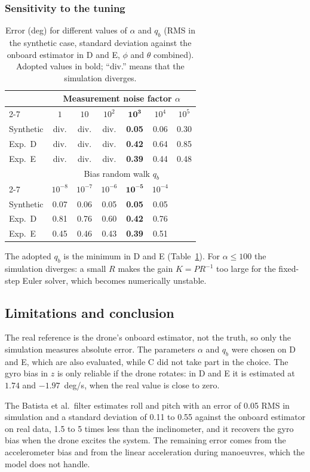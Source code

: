 \documentclass[11pt]{article}
\begin{document}
\subsubsection{Sensitivity to the tuning}
\label{sec:sens}

\begin{table}[htbp]
\caption{Error (deg) for different values of $\alpha$ and $q_b$ (RMS in the synthetic case, standard deviation against the onboard estimator in D and E, $\phi$ and $\theta$ combined). Adopted values in bold; ``div.'' means that the simulation diverges.}
\label{tab:sens}
\centering
\setlength{\tabcolsep}{6pt}
\begin{tabular}{l cccccc}
\toprule
 & \multicolumn{6}{c}{Measurement noise factor $\alpha$} \\
\cmidrule(lr){2-7}
 & $1$ & $10$ & $10^{2}$ & $\mathbf{10^{3}}$ & $10^{4}$ & $10^{5}$ \\
\midrule
Synthetic & div. & div. & div. & \textbf{0.05} & 0.06 & 0.30 \\
Exp.\ D   & div. & div. & div. & \textbf{0.42} & 0.64 & 0.85 \\
Exp.\ E   & div. & div. & div. & \textbf{0.39} & 0.44 & 0.48 \\
\midrule
 & \multicolumn{6}{c}{Bias random walk $q_b$} \\
\cmidrule(lr){2-7}
 & $10^{-8}$ & $10^{-7}$ & $10^{-6}$ & $\mathbf{10^{-5}}$ & $10^{-4}$ & \\
\midrule
Synthetic & 0.07 & 0.06 & 0.05 & \textbf{0.05} & 0.05 & \\
Exp.\ D   & 0.81 & 0.76 & 0.60 & \textbf{0.42} & 0.76 & \\
Exp.\ E   & 0.45 & 0.46 & 0.43 & \textbf{0.39} & 0.51 & \\
\bottomrule
\end{tabular}
\end{table}

The adopted $q_b$ is the minimum in D and E (Table~\ref{tab:sens}).
For $\alpha\le100$ the simulation diverges: a small $R$ makes the gain $K=PR^{-1}$ too large for the fixed-step Euler solver, which becomes numerically unstable.

\subsection{Limitations and conclusion}
\label{sec:limits}

The real reference is the drone's onboard estimator, not the truth, so only the simulation measures absolute error.
The parameters $\alpha$ and $q_b$ were chosen on D and E, which are also evaluated, while C did not take part in the choice.
The gyro bias in $z$ is only reliable if the drone rotates: in D and E it is estimated at $1.74$ and $-1.97$~deg/s, when the real value is close to zero.

The Batista et al.\ filter estimates roll and pitch with an error of 0.05\textdegree{} RMS in simulation and a standard deviation of 0.11\textdegree{} to 0.55\textdegree{} against the onboard estimator on real data, 1.5 to 5 times less than the inclinometer, and it recovers the gyro bias when the drone excites the system.
The remaining error comes from the accelerometer bias and from the linear acceleration during manoeuvres, which the model does not handle.
\end{document}
